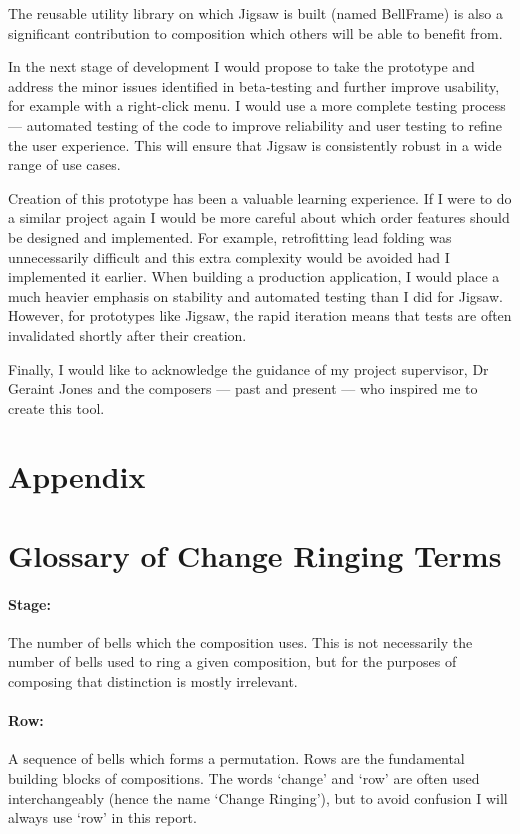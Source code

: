 \documentclass[12pt]{article}
\begin{document}
The reusable utility library on which Jigsaw is built (named BellFrame) is also a significant
contribution to composition which others will be able to benefit from.

In the next stage of development I would propose to take the prototype and address the minor issues
identified in beta-testing and further improve usability, for example with a right-click menu. I
would use a more complete testing process --- automated testing of the code to improve reliability
and user testing to refine the user experience.  This will ensure that Jigsaw is consistently
robust in a wide range of use cases.

Creation of this prototype has been a valuable learning experience.  If I were to do a similar
project again I would be more careful about which order features should be designed and implemented.
For example, retrofitting lead folding was unnecessarily difficult and this extra complexity would
be avoided had I implemented it earlier.  When building a production application, I would place a
much heavier emphasis on stability and automated testing than I did for Jigsaw.  However, for
prototypes like Jigsaw, the rapid iteration means that tests are often invalidated shortly after
their creation.

Finally, I would like to acknowledge the guidance of my project supervisor, Dr Geraint Jones and the
composers --- past and present --- who inspired me to create this tool.



\pagebreak

\section{Appendix}

\appendix

\section{Glossary of Change Ringing Terms}\label{sec:glossary}

\paragraph{Stage:} The number of bells which the composition uses.  This is not necessarily the
number of bells used to ring a given composition, but for the purposes of composing that
distinction is mostly irrelevant.

\paragraph{Row:} A sequence of bells which forms a permutation.  Rows are the fundamental building
blocks of compositions.  The words `change' and `row' are often used interchangeably (hence the name
`Change Ringing'), but to avoid confusion I will always use `row' in this report.
\end{document}
